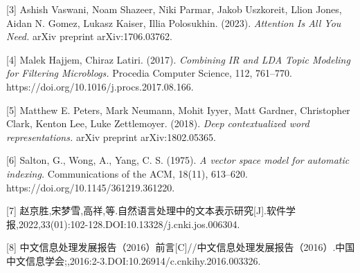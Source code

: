 \documentclass[12pt,a4paper]{book}
\begin{document}
{[}3{]} Ashish Vaswani, Noam Shazeer, Niki Parmar, Jakob Uszkoreit,
Llion Jones, Aidan N. Gomez, Lukasz Kaiser, Illia Polosukhin. (2023).
\emph{Attention Is All You Need.} arXiv preprint arXiv:1706.03762.

{[}4{]} Malek Hajjem, Chiraz Latiri. (2017). \emph{Combining IR and LDA
Topic Modeling for Filtering Microblogs.} Procedia Computer Science,
112, 761--770. https://doi.org/10.1016/j.procs.2017.08.166.

{[}5{]} Matthew E. Peters, Mark Neumann, Mohit Iyyer, Matt Gardner,
Christopher Clark, Kenton Lee, Luke Zettlemoyer. (2018). \emph{Deep
contextualized word representations.} arXiv preprint arXiv:1802.05365.

{[}6{]} Salton, G., Wong, A., Yang, C. S. (1975). \emph{A vector space
model for automatic indexing.} Communications of the ACM, 18(11),
613--620. https://doi.org/10.1145/361219.361220.

{[}7{]}
赵京胜,宋梦雪,高祥,等.自然语言处理中的文本表示研究{[}J{]}.软件学报,2022,33(01):102-128.DOI:10.13328/j.cnki.jos.006304.

{[}8{]}
中文信息处理发展报告（2016）前言{[}C{]}//中文信息处理发展报告（2016）.中国中文信息学会;,2016:2-3.DOI:10.26914/c.cnkihy.2016.003326.
\end{document}

